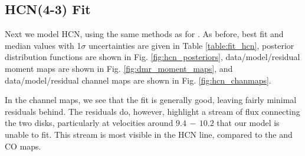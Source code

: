 




\subsection{HCN(4-3) Fit}
\label{subsection:hcn_fit}

Next we model HCN, using the same methods as for \hco. As before, best fit and median values with 1$\sigma$  uncertainties are given in Table \ref{table:fit_hcn}, posterior distribution functions are shown in Fig. \ref{fig:hcn_posteriors}, data/model/residual moment maps are shown in Fig. \ref{fig:dmr_moment_maps}, and data/model/residual channel maps are shown in Fig. \ref{fig:hcn_chanmaps}.

In the channel maps, we see that the fit is generally good, leaving fairly minimal residuals behind. The residuals do, however, highlight a stream of flux connecting the two disks, particularly at velocities around $9.4\,-\,10.2$ \kms{} that our model is unable to fit. This stream is most visible in the HCN line, compared to the \hco{} and CO maps.


